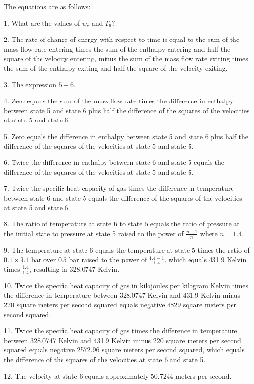 The equations are as follows:

1. What are the values of \( w_c \) and \( T_6 \)?

2. The rate of change of energy with respect to time is equal to the sum of the mass flow rate entering times the sum of the enthalpy entering and half the square of the velocity entering, minus the sum of the mass flow rate exiting times the sum of the enthalpy exiting and half the square of the velocity exiting.

3. The expression \( 5-6 \).

4. Zero equals the sum of the mass flow rate times the difference in enthalpy between state 5 and state 6 plus half the difference of the squares of the velocities at state 5 and state 6.

5. Zero equals the difference in enthalpy between state 5 and state 6 plus half the difference of the squares of the velocities at state 5 and state 6.

6. Twice the difference in enthalpy between state 6 and state 5 equals the difference of the squares of the velocities at state 5 and state 6.

7. Twice the specific heat capacity of gas times the difference in temperature between state 6 and state 5 equals the difference of the squares of the velocities at state 5 and state 6.

8. The ratio of temperature at state 6 to state 5 equals the ratio of pressure at the initial state to pressure at state 5 raised to the power of \( \frac{n-1}{n} \) where \( n = 1.4 \).

9. The temperature at state 6 equals the temperature at state 5 times the ratio of \( 0.1 \times 9.1 \) bar over \( 0.5 \) bar raised to the power of \( \frac{1.4 - 1}{1.4} \), which equals 431.9 Kelvin times \( \frac{1.4}{1.4} \), resulting in \( 328.0747 \) Kelvin.

10. Twice the specific heat capacity of gas in kilojoules per kilogram Kelvin times the difference in temperature between 328.0747 Kelvin and 431.9 Kelvin minus 220 square meters per second squared equals negative 4829 square meters per second squared.

11. Twice the specific heat capacity of gas times the difference in temperature between 328.0747 Kelvin and 431.9 Kelvin minus 220 square meters per second squared equals negative 2572.96 square meters per second squared, which equals the difference of the squares of the velocities at state 6 and state 5.

12. The velocity at state 6 equals approximately \( 50.7244 \) meters per second.